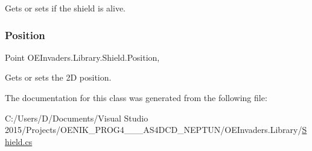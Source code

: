 Gets or sets if the shield is alive. 

\mbox{\label{class_o_e_invaders_1_1_library_1_1_shield_a4c5ea918425ebd9b922f9d463f69f583}} 
\subsubsection{\texorpdfstring{Position}{Position}}
{\footnotesize\ttfamily Point O\+E\+Invaders.\+Library.\+Shield.\+Position\hspace{0.3cm}{\ttfamily [get]}, {\ttfamily [set]}}



Gets or sets the 2D position. 



The documentation for this class was generated from the following file\+:\begin{DoxyCompactItemize}
\item 
C\+:/\+Users/\+D/\+Documents/\+Visual Studio 2015/\+Projects/\+O\+E\+N\+I\+K\+\_\+\+P\+R\+O\+G4\+\_\+\_\+\_\+\+A\+S4\+D\+C\+D\+\_\+\+N\+E\+P\+T\+U\+N/\+O\+E\+Invaders.\+Library/\mbox{\hyperlink{_shield_8cs}{Shield.\+cs}}\end{DoxyCompactItemize}
